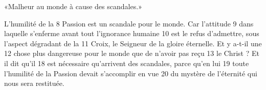 «Malheur au monde à cause des scandales.»

L'humilité de la	 
8	 	Passion est un scandale pour le monde. Car l'attitude	 
9	 	dans laquelle s'enferme avant tout l'ignorance humaine	 
10	 	est le refus d'admettre, sous l'aspect dégradant de la	 
11	 	Croix, le Seigneur de la gloire éternelle. Et y a-t-il une	 
12	 	chose plus dangereuse pour le monde que de n'avoir pas reçu	 
13	 	le Christ ? Et il dit qu'il	 
18	 	est nécessaire qu'arrivent des scandales, parce qu'en lui	 
19	 	toute l'humilité de la Passion devait s'accomplir en vue	 
20	 	du mystère de l'éternité qui nous sera restituée.